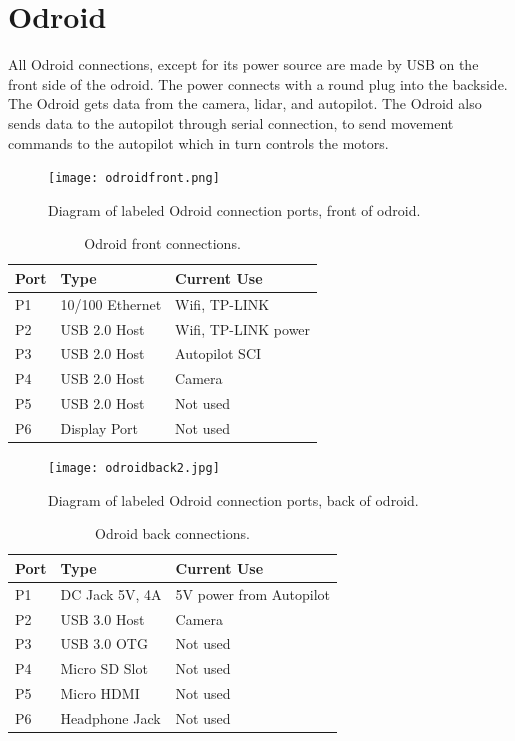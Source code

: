 \documentclass[letterpaper,12pt]{report}
\begin{document}
\section{Odroid}
All Odroid connections, except for its power source are made by USB on the front side of the odroid. The power connects with a round plug into the backside. The Odroid gets data from the camera, lidar, and autopilot. The Odroid also sends data to the autopilot through serial connection, to send movement commands to the autopilot which in turn controls the motors. 
\begin{figure}[h]
	\centering
	\texttt{[image: odroidfront.png]}
	\caption{Diagram of labeled Odroid connection ports, front of odroid.}
	\label{Figure 1:}
\end{figure}
\begin{table}[h]
	\centering
	\begin{tabular}{| l | l | l |}
 		\hline
 		Port & Type & Current Use \\ \hline 
 		P1 & 10/100 Ethernet & Wifi, TP-LINK \\ \hline
 		P2 & USB 2.0 Host & Wifi, TP-LINK power \\ \hline
 		P3 & USB 2.0 Host & Autopilot SCI \\ \hline
 		P4 & USB 2.0 Host & Camera \\ \hline
 		P5 & USB 2.0 Host & Not used \\ \hline
 		P6 & Display Port & Not used\\ \hline
	\end{tabular}
	\caption{Odroid front connections.}
\end{table}
\begin{figure}[h]
	\centering
	\texttt{[image: odroidback2.jpg]}
	\caption{Diagram of labeled Odroid connection ports, back of odroid.}
	\label{Figure 1:}
\end{figure}
\begin{table}[h]
	\centering
	\begin{tabular}{| l | l | l |}
 		\hline
 		Port & Type & Current Use \\ \hline 
 		P1 & DC Jack 5V, 4A & 5V power from Autopilot \\ \hline
 		P2 & USB 3.0 Host & Camera \\ \hline
 		P3 & USB 3.0 OTG & Not used \\ \hline
 		P4 & Micro SD Slot & Not used \\ \hline
 		P5 & Micro HDMI & Not used \\ \hline
 		P6 & Headphone Jack & Not used \\ \hline
	\end{tabular}
	\caption{Odroid back connections.}
\end{table}
\end{document}

